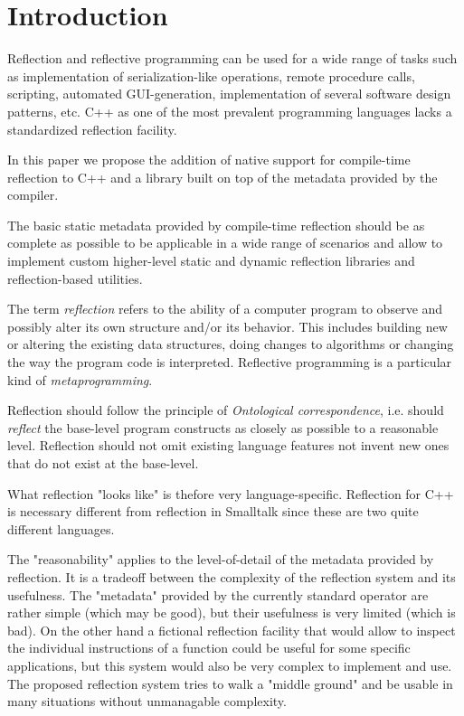 \section{Introduction}

Reflection and reflective programming can be used
for a wide range of tasks such as implementation of serialization-like operations,
remote procedure calls, scripting, automated GUI-generation,
implementation of several software design patterns, etc.
C++ as one of the most prevalent programming languages 
lacks a standardized reflection facility.

In this paper we propose the addition of native support for
compile-time reflection to C++ and a library built
on top of the metadata provided by the compiler.

The basic static metadata provided by compile-time reflection
should be as complete as possible to be applicable in a wide
range of scenarios and allow to implement custom higher-level
static and dynamic reflection libraries and reflection-based
utilities.

The term \emph{reflection} refers to the ability of a computer program
to observe and possibly alter its own structure and/or its behavior.
This includes building new or altering the existing data structures,
doing changes to algorithms or changing the way the program code
is interpreted. Reflective programming is a particular kind
of \emph{metaprogramming}.

Reflection should follow the principle of {\em Ontological correspondence},
i.e. should {\em reflect} the base-level program constructs as closely
as possible to a reasonable level.
Reflection should not omit existing language features not invent new
ones that do not exist at the base-level.

What reflection "looks like" is thefore very language-specific.
Reflection for C++ is necessary different from reflection in Smalltalk
since these are two quite different languages.

The "reasonability" applies to the level-of-detail of the metadata
provided by reflection. It is a tradeoff between the complexity
of the reflection system and its usefulness. The "metadata" provided
by the currently standard \verb@typeid@ operator are rather simple
(which may be good), but their usefulness is very limited (which
is bad). On the other hand a fictional reflection facility that would
allow to inspect the individual instructions of a function could
be useful for some specific applications, but this system would
also be very complex to implement and use.
The proposed reflection system tries to walk a "middle ground"
and be usable in many situations without unmanagable complexity.


